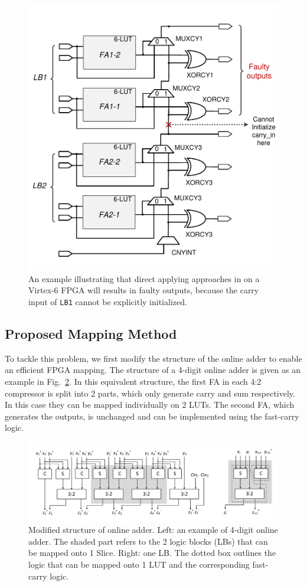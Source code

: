 \documentclass[conference]{IEEEtran}
\begin{document}
\begin{figure}[tbp]
	\centering
	\includegraphics[width=.45\textwidth]{./Figures/SDadder_FastCarry_PreviousWork.pdf}
	\caption{An example illustrating that direct applying approaches in \cite{FPT09RA} on a Virtex-6 FPGA will results in faulty outputs, because the carry input of \texttt{LB1} cannot be explicitly initialized.}
	\label{Fig:PreWorkVirtex6}
\end{figure}

\subsection{Proposed Mapping Method}
To tackle this problem, we first modify the structure of the online adder to enable an efficient FPGA mapping. The structure of a 4-digit online adder is given as an example in Fig.~\ref{Fig:ModifiedOA}. In this equivalent structure, the first FA in each 4:2 compressor is split into 2 parts, which only generate carry and sum respectively. In this case they can be mapped individually on 2 LUTs. The second FA, which generates the outputs, is unchanged and can be implemented using the fast-carry logic.



\begin{figure}[tbp]
	\centering
	\includegraphics[width=.85\textwidth]{./Figures/SDadder_FPGA_New_4digit2.pdf}
	\caption{Modified structure of online adder. Left: an example of 4-digit online adder. The shaded part refers to the 2 logic blocks (LBs) that can be mapped onto 1 Slice. Right: one LB. The dotted box outlines the logic that can be mapped onto 1 LUT and the corresponding fast-carry logic.}
	\vspace{-1ex}	
	\label{Fig:ModifiedOA}
\end{figure}
\end{document}
